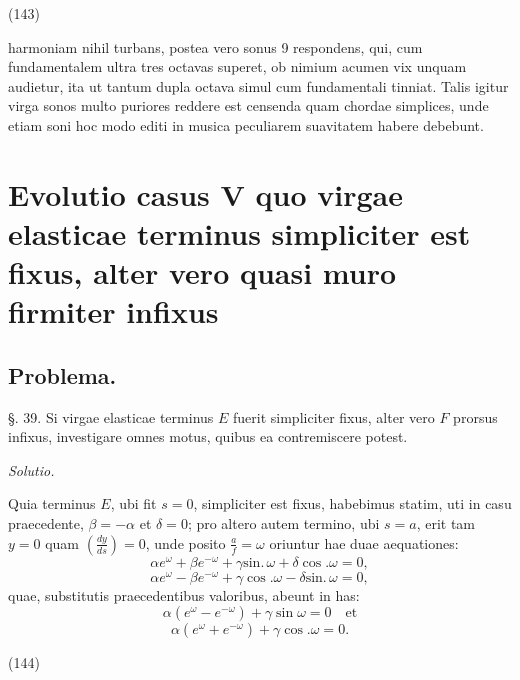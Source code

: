 \documentclass[11pt,a4paper]{article}
\begin{document}
(143)

harmoniam nihil turbans, postea vero  sonus  9 respondens,
qui, cum fundamentalem ultra  tres octavas superet, ob nimium acumen
vix unquam audietur, ita ut tantum dupla octava simul cum fundamentali
tinniat. Talis igitur virga sonos multo puriores reddere est censenda
quam chordae simplices, unde etiam soni hoc modo editi in musica
peculiarem suavitatem habere debebunt.

\section{Evolutio casus V quo virgae elasticae terminus simpliciter est fixus, alter vero quasi muro firmiter infixus}

\subsection{Problema.}

§. 39. Si virgae elasticae terminus $E$ fuerit simpliciter fixus,
alter vero $F$ prorsus infixus, investigare omnes motus, quibus ea
contremiscere potest.

\emph{Solutio.}

Quia terminus $E$, ubi fit $s=0$, simpliciter est fixus, habebimus
statim, uti in casu praecedente, $\beta=-\alpha$ et $\delta=0$; pro altero autem
termino, ubi $s=a$, erit tam $y=0$ quam $\left(\frac{dy}{ds}\right)=0$, unde posito $\frac{a}{f}=\omega$
oriuntur hae duae aequationes:
\[ \alpha e^{\omega}+\beta e^{-\omega}+\gamma\text{sin.}\,\omega+\delta\cos.\omega=0, \]
\[ \alpha e^{\omega}-\beta e^{-\omega}+\gamma\cos.\omega-\delta\text{sin.}\,\omega=0, \]
quae, substitutis praecedentibus valoribus, abeunt in has:
\[ \alpha(e^{\omega}-e^{-\omega})+\gamma\sin \omega=0 \quad\text{et} \]
\[ \alpha(e^{\omega}+e^{-\omega})+\gamma\cos.\omega=0. \]

(144)
\end{document}
